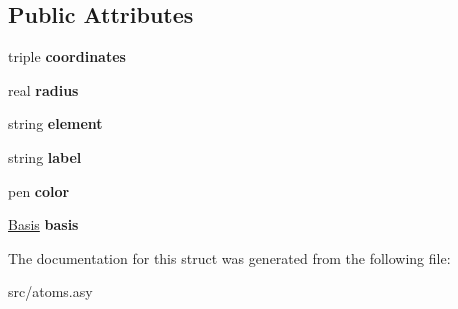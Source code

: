 \subsection*{Public Attributes}
\begin{DoxyCompactItemize}
\item 
\hypertarget{structAtom_ac7c79b0602be748e32b85999feb4d650}{triple {\bfseries coordinates}}\label{structAtom_ac7c79b0602be748e32b85999feb4d650}

\item 
\hypertarget{structAtom_ad656dc8c0c0dc165b308638213126fc5}{real {\bfseries radius}}\label{structAtom_ad656dc8c0c0dc165b308638213126fc5}

\item 
\hypertarget{structAtom_a404a91d6b6e2d23196faeac0cad3dbe2}{string {\bfseries element}}\label{structAtom_a404a91d6b6e2d23196faeac0cad3dbe2}

\item 
\hypertarget{structAtom_a49561fb850610aaf264fc29ea7ecf1f7}{string {\bfseries label}}\label{structAtom_a49561fb850610aaf264fc29ea7ecf1f7}

\item 
\hypertarget{structAtom_a7bbda425d42eac82113b6a4a7e779860}{pen {\bfseries color}}\label{structAtom_a7bbda425d42eac82113b6a4a7e779860}

\item 
\hypertarget{structAtom_a62c4153b029c5edfee8d567aa8cc3c72}{\hyperlink{structBasis}{Basis} {\bfseries basis}}\label{structAtom_a62c4153b029c5edfee8d567aa8cc3c72}

\end{DoxyCompactItemize}


The documentation for this struct was generated from the following file\+:\begin{DoxyCompactItemize}
\item 
src/atoms.\+asy\end{DoxyCompactItemize}
